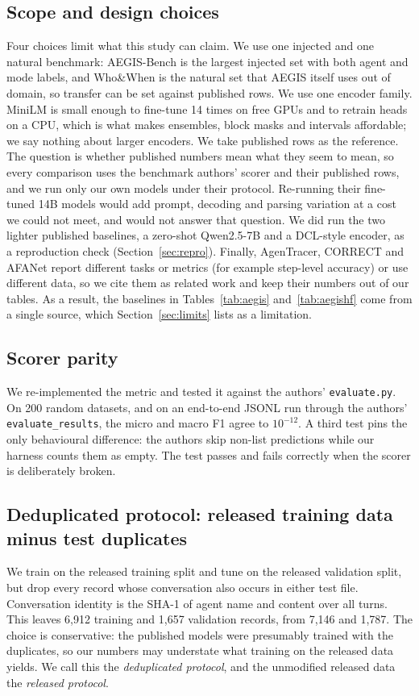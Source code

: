 \documentclass[conference]{IEEEtran}
\begin{document}
\subsection{Scope and design choices}\label{sec:scope}
Four choices limit what this study can claim. We use one injected and one natural benchmark: AEGIS-Bench is the largest injected set with both agent and mode labels, and Who\&When is the natural set that AEGIS itself uses out of domain, so transfer can be set against published rows. We use one encoder family. MiniLM is small enough to fine-tune 14 times on free GPUs and to retrain heads on a CPU, which is what makes ensembles, block masks and intervals affordable; we say nothing about larger encoders. We take published rows as the reference. The question is whether published numbers mean what they seem to mean, so every comparison uses the benchmark authors' scorer and their published rows, and we run only our own models under their protocol. Re-running their fine-tuned 14B models would add prompt, decoding and parsing variation at a cost we could not meet, and would not answer that question. We did run the two lighter published baselines, a zero-shot Qwen2.5-7B and a DCL-style encoder, as a reproduction check (Section~\ref{sec:repro}). Finally, AgenTracer, CORRECT and AFANet report different tasks or metrics (for example step-level accuracy) or use different data, so we cite them as related work and keep their numbers out of our tables. As a result, the baselines in Tables~\ref{tab:aegis} and~\ref{tab:aegishf} come from a single source, which Section~\ref{sec:limits} lists as a limitation.

\subsection{Scorer parity}
We re-implemented the metric and tested it against the authors' \texttt{evaluate.py}. On 200 random datasets, and on an end-to-end JSONL run through the authors' \texttt{evaluate\_results}, the micro and macro F1 agree to $10^{-12}$. A third test pins the only behavioural difference: the authors skip non-list predictions while our harness counts them as empty. The test passes and fails correctly when the scorer is deliberately broken.

\subsection{Deduplicated protocol: released training data minus test duplicates}
We train on the released training split and tune on the released validation split, but drop every record whose conversation also occurs in either test file. Conversation identity is the SHA-1 of agent name and content over all turns. This leaves 6,912 training and 1,657 validation records, from 7,146 and 1,787. The choice is conservative: the published models were presumably trained with the duplicates, so our numbers may understate what training on the released data yields. We call this the \emph{deduplicated protocol}, and the unmodified released data the \emph{released protocol}.
\end{document}
